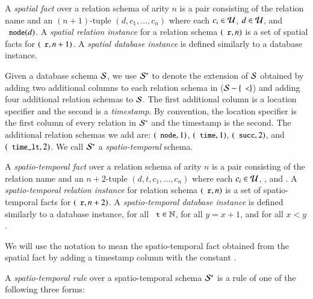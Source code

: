 A {\em spatial fact} over a relation schema of arity $n$ is a pair consisting of the relation name and an $(n+1)$-tuple $(d,c_1,\ldots,c_n)$ where each $c_i \in \univ$, $d \in \univ$, and $\dedalus{node}(d)$.  
A {\em spatial relation instance} for a relation schema $(\dedalus{r},n)$ is a set of spatial facts for $(\dedalus{r},n+1)$.
A {\em spatial database instance} is defined similarly to a database instance.

Given a database schema $\schema$, we use $\stschema$ to denote the extension of
$\schema$ obtained by adding two additional columns to each relation schema in ($\schema - \{\dedalus{<}\}$) and adding four additional relation schemas to $\schema$. 
The first additional column is a location specifier and the second is a {\em timestamp}.  By convention, the location specifier is the first column of every relation in $\stschema$ and the timestamp is the second.  
The additional relation schemas we add are: $(\dedalus{node},1)$,
$(\dedalus{time},1)$, $(\dedalus{succ},2)$, and $(\dedalus{time_lt},2)$.
We call $\stschema$ a {\em spatio-temporal} schema.

A {\em spatio-temporal fact} over a relation schema of arity $n$ is a pair consisting of the relation name and an $n+2$-tuple $(d,t,c_1,\ldots,c_n)$ where each $c_i \in \univ$, , and .  A {\em spatio-temporal relation instance} for relation schema $(\dedalus{r},n)$ is a set of spatio-temporal facts for
$(\dedalus{r},n+2)$.  A {\em spatio-temporal database instance} is defined similarly to a database instance,  for all $\dedalus{t} \in \mathbb{N}$,  for all $y = x + 1$, and  for all $x < y$.

We will use the notation  to mean the spatio-temporal fact obtained from the spatial fact  by adding a timestamp column with the constant .

A {\em spatio-temporal rule} over a spatio-temporal schema $\stschema$ is a rule of one of the following three forms:


